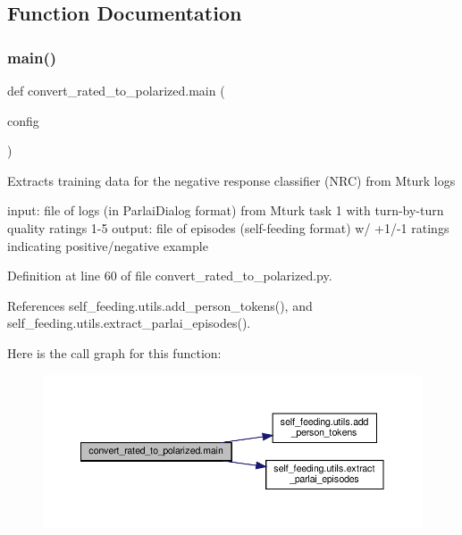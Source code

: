 \subsection{Function Documentation}
\mbox{\label{namespaceconvert__rated__to__polarized_a3f349162526c4fd1dae393cc9d9ac2fe}} 
\subsubsection{\texorpdfstring{main()}{main()}}
{\footnotesize\ttfamily def convert\+\_\+rated\+\_\+to\+\_\+polarized.\+main (\begin{DoxyParamCaption}\item[{}]{config }\end{DoxyParamCaption})}

\begin{DoxyVerb}Extracts training data for the negative response classifier (NRC) from Mturk logs

input: file of logs (in ParlaiDialog format) from Mturk task 1 with turn-by-turn
    quality ratings 1-5
output: file of episodes (self-feeding format) w/ +1/-1 ratings indicating
    positive/negative example
\end{DoxyVerb}
 

Definition at line 60 of file convert\+\_\+rated\+\_\+to\+\_\+polarized.\+py.



References self\+\_\+feeding.\+utils.\+add\+\_\+person\+\_\+tokens(), and self\+\_\+feeding.\+utils.\+extract\+\_\+parlai\+\_\+episodes().

Here is the call graph for this function\+:
\nopagebreak
\begin{figure}[H]
\begin{center}
\leavevmode
\includegraphics[width=350pt]{namespaceconvert__rated__to__polarized_a3f349162526c4fd1dae393cc9d9ac2fe_cgraph}
\end{center}
\end{figure}
\mbox{\label{namespaceconvert__rated__to__polarized_a8bc22c281ecfa0599048982d56f71437}} 
